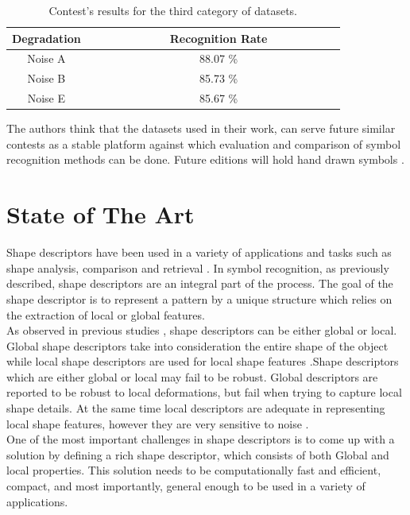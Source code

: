 \begin{table}[h]
\centering
\caption{Contest's results for the third category of datasets.}
\begin{tabular}{ccccccccccccccc}
  \hline
      Degradation & & & & & & & & Recognition Rate \\
  \hline
      Noise A & & & & & & & &  88.07 \% \\
      Noise B & & & & & & & &  85.73 \% \\
      Noise E & & & & & & & &  85.67 \% \\   
  \hline
\end{tabular}
\end{table}
      

The authors think that the datasets used in their work, can serve future similar contests as a stable platform against which evaluation and comparison  of symbol recognition methods can be done. Future editions will hold hand drawn symbols \cite{Delalandre_2012}.


\section {State of The Art}

Shape descriptors have been used in a variety of applications and tasks such as shape analysis, comparison and retrieval \cite{Heider}. In symbol recognition, as previously described, shape descriptors are an integral part of the process. The goal of the shape descriptor is to represent a pattern by a unique structure which relies on the extraction of local or global features. \\

As observed in previous studies \cite{Alajlan}, shape descriptors can be either global or local. Global shape descriptors take into consideration the entire shape of the object while local shape descriptors are used for local shape features \cite{wang}.Shape descriptors which are either global or local may fail to be robust. Global descriptors are reported to be robust to local deformations, but fail when trying to capture local shape details. At the same time local descriptors are adequate in representing local shape features, however they are very sensitive to noise \cite{wang}. \\

One of the most important challenges in shape descriptors is to come up with a solution by defining a rich shape descriptor, which consists of both Global and local properties. This solution needs to be computationally fast and efficient, compact, and most importantly, general enough to be used in a variety of applications.

